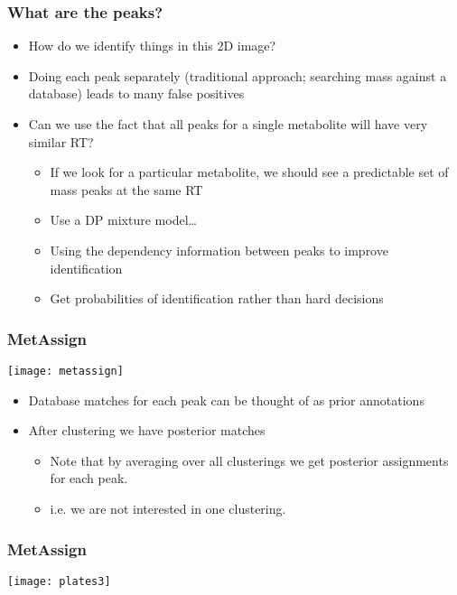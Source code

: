 \begin{frame}
	\frametitle{What are the peaks?}
	\begin{itemize}
		\item How do we identify things in this 2D image?
		\item Doing each peak separately (traditional approach; searching mass against a database) leads to many false positives
		\item Can we use the fact that all peaks for a single metabolite will have very similar \ac{RT}?
		\begin{itemize}
			\item If we look for a particular metabolite, we should see a predictable set of mass peaks at the same \ac{RT}
			\item Use a \ac{DP} mixture model\ldots
			\item Using the dependency information between peaks to improve identification
			\item Get probabilities of identification rather than hard decisions
		\end{itemize}
	\end{itemize}
\end{frame}

\begin{frame}
	\frametitle{MetAssign}
	\texttt{[image: metassign]}
	\begin{itemize}
		\item Database matches for each peak can be thought of as prior annotations
		\item After clustering we have posterior matches
		\begin{itemize}
			\item Note that by averaging over all clusterings we get posterior assignments for each peak.
			\item i.e. we are not interested in one clustering.
		\end{itemize}
	\end{itemize}
\end{frame}


\begin{frame}
	\frametitle{MetAssign}
	\centering\texttt{[image: plates3]}
\end{frame}

